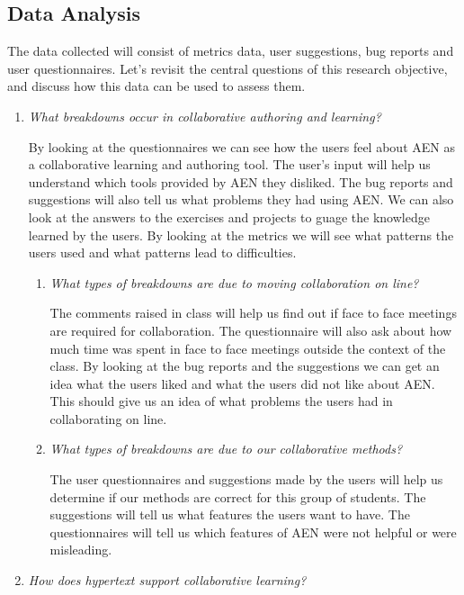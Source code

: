 \subsection{Data Analysis}
The data collected will consist of metrics data, user suggestions, bug
reports and user questionnaires.  Let's revisit the central questions of
this research objective, and discuss how this data can be used to assess
them.
\begin{enumerate}
\item{\em What breakdowns occur in collaborative authoring and learning?}

  By looking at the questionnaires we can see how the users feel about
  AEN as a collaborative learning and authoring tool.  The user's input
  will help us understand which tools provided by AEN they disliked.
  The bug reports and suggestions will also tell us what problems they
  had using AEN.  We can also look at the answers to the exercises and
  projects to guage the knowledge learned by the users.  By looking at the
  metrics we will see what patterns the users used and what patterns lead
  to difficulties.

  \begin{enumerate}
  \item{\em What types of breakdowns are due to moving collaboration on
    line?}

  The comments raised in class will help us find out if face to face
  meetings are required for collaboration.  The questionnaire will also ask
  about how much time was spent in face to face meetings outside the
  context of the class.  By looking at the bug reports and the suggestions
  we can get an idea what the users liked and what the users did not like
  about AEN.  This should give us an idea of what problems the users had in
  collaborating on line.
\item{\em What types of breakdowns are due to our collaborative methods?}

  The user questionnaires and suggestions made by the users will help us
  determine if our methods are correct for this group of students.  The
  suggestions will tell us what features the users want to have.  The
  questionnaires will tell us which features of AEN were not helpful or were
  misleading.
\end{enumerate} 
\item{\em How does hypertext support collaborative learning?}  


\end{enumerate}
